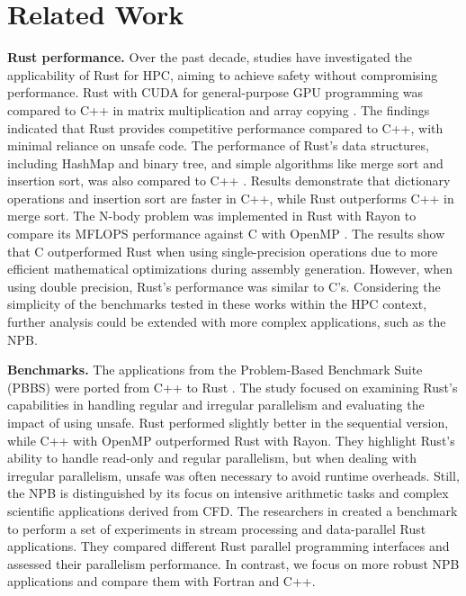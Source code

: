 \section{Related Work}
\label{sec:rw}
\textbf{Rust performance.} Over the past decade, studies have investigated the applicability of Rust for HPC, aiming to achieve safety without compromising performance. Rust with CUDA for general-purpose GPU programming was compared to C++ in matrix multiplication and array copying \cite{rw_tes}. The findings indicated that Rust provides competitive performance compared to C++, with minimal reliance on unsafe code. The performance of Rust's data structures, including HashMap and binary tree, and simple algorithms like merge sort and insertion sort, was also compared to C++ \cite{rw_isfast}. Results demonstrate that dictionary operations and insertion sort are faster in C++, while Rust outperforms C++ in merge sort. The N-body problem was implemented in Rust with Rayon to compare its MFLOPS performance against C with OpenMP \cite{rw_pervsprog}. The results show that C outperformed Rust when using single-precision operations due to more efficient mathematical optimizations during assembly generation. However, when using double precision, Rust's performance was similar to C's. Considering the simplicity of the benchmarks tested in these works within the HPC context, further analysis could be extended with more complex applications, such as the NPB.

\textbf{Benchmarks.} The applications from the Problem-Based Benchmark Suite (PBBS) \cite{pbbs_c} were ported from C++ to Rust \cite{rw_zerocost}. The study focused on examining Rust's capabilities in handling regular and irregular parallelism and evaluating the impact of using unsafe. Rust performed slightly better in the sequential version, while C++ with OpenMP outperformed Rust with Rayon. They highlight Rust's ability to handle read-only and regular parallelism, but when dealing with irregular parallelism, unsafe was often necessary to avoid runtime overheads. Still, the NPB is distinguished by its focus on intensive arithmetic tasks and complex scientific applications derived from CFD. The researchers in \cite{PIEPER:COLA:21} created a benchmark to perform a set of experiments in stream processing and data-parallel Rust applications. They compared different Rust parallel programming interfaces and assessed their parallelism performance. In contrast, we focus on more robust NPB applications and compare them with Fortran and C++.

